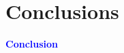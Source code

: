 \documentclass[8pt, aspectratio=169]{beamer}
\begin{document}
%
%
%
%
%
%

\section{Conclusions}
\begin{frame}
    \begin{center}
       \Huge \textcolor{blue}{\textbf{Conclusion}} \\
    \end{center}
\end{frame}
\end{document}
